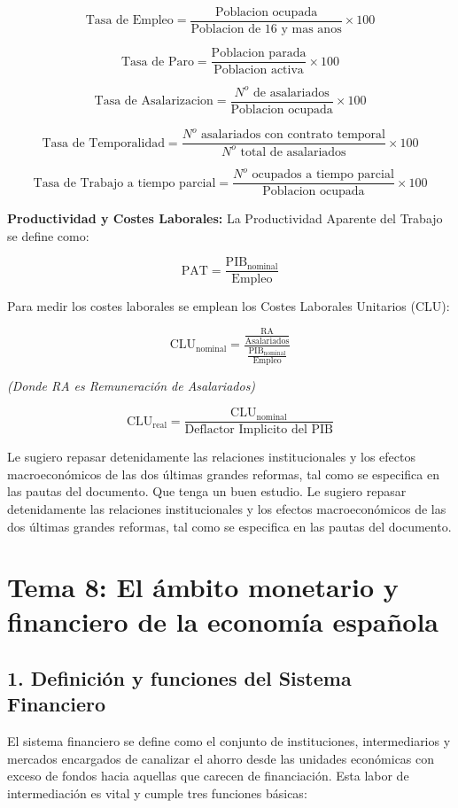 \[
\text{Tasa de Empleo} = \frac{\text{Poblacion ocupada}}{\text{Poblacion de 16 y mas anos}} \times 100
\]

\[
\text{Tasa de Paro} = \frac{\text{Poblacion parada}}{\text{Poblacion activa}} \times 100
\]

\[
\text{Tasa de Asalarizacion} = \frac{N^{o} \text{ de asalariados}}{\text{Poblacion ocupada}} \times 100
\]

\[
\text{Tasa de Temporalidad} = \frac{N^{o} \text{ asalariados con contrato temporal}}{N^{o} \text{ total de asalariados}} \times 100
\]

\[
\text{Tasa de Trabajo a tiempo parcial} = \frac{N^{o} \text{ ocupados a tiempo parcial}}{\text{Poblacion ocupada}} \times 100
\]

\textbf{Productividad y Costes Laborales:}
La Productividad Aparente del Trabajo se define como:

\[
\text{PAT} = \frac{\text{PIB}_{\text{nominal}}}{\text{Empleo}}
\]

Para medir los costes laborales se emplean los Costes Laborales Unitarios (CLU):

\[
\text{CLU}_{\text{nominal}} = \frac{\frac{\text{RA}}{\text{Asalariados}}}{\frac{\text{PIB}_{\text{nominal}}}{\text{Empleo}}}
\]

\textit{(Donde RA es Remuneración de Asalariados)}

\[
\text{CLU}_{\text{real}} = \frac{\text{CLU}_{\text{nominal}}}{\text{Deflactor Implicito del PIB}}
\]

Le sugiero repasar detenidamente las relaciones institucionales y los efectos macroeconómicos de las dos últimas grandes reformas, tal como se especifica en las pautas del documento. Que tenga un buen estudio.
Le sugiero repasar detenidamente las relaciones institucionales y los efectos macroeconómicos de las dos últimas grandes reformas, tal como se especifica en las pautas del documento.

\clearpage
\section*{Tema 8: El ámbito monetario y financiero de la economía española}

 
\subsection*{1. Definición y funciones del Sistema Financiero}

El sistema financiero se define como el conjunto de instituciones, intermediarios y mercados encargados de canalizar el ahorro desde las unidades económicas con exceso de fondos hacia aquellas que carecen de financiación. Esta labor de intermediación es vital y cumple tres funciones básicas:

